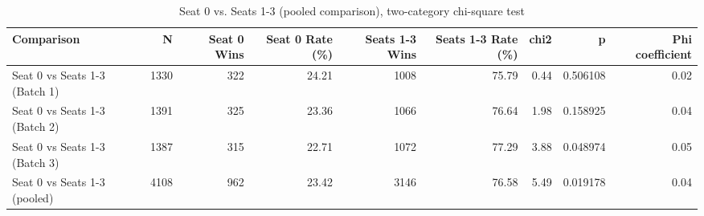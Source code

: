\begin{table}[htbp]
\centering
\caption{Seat 0 vs. Seats 1-3 (pooled comparison), two-category chi-square test}
\label{tab:seat0_vs_rest}
\begin{tabular}{lrrrrrrrr}
\toprule
Comparison & N & Seat 0 Wins & Seat 0 Rate (\%) & Seats 1-3 Wins & Seats 1-3 Rate (\%) & chi2 & p & Phi coefficient \\
\midrule
Seat 0 vs Seats 1-3 (Batch 1) & 1330 & 322 & 24.21 & 1008 & 75.79 & 0.44 & 0.506108 & 0.02 \\
Seat 0 vs Seats 1-3 (Batch 2) & 1391 & 325 & 23.36 & 1066 & 76.64 & 1.98 & 0.158925 & 0.04 \\
Seat 0 vs Seats 1-3 (Batch 3) & 1387 & 315 & 22.71 & 1072 & 77.29 & 3.88 & 0.048974 & 0.05 \\
Seat 0 vs Seats 1-3 (pooled) & 4108 & 962 & 23.42 & 3146 & 76.58 & 5.49 & 0.019178 & 0.04 \\
\bottomrule
\end{tabular}
\end{table}